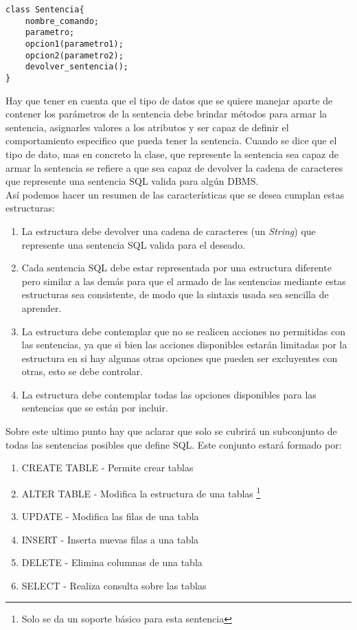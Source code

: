 \begin{lstlisting}[title=Pseudocódigo de la estructura de dato que contiene la sentencia]
class Sentencia{
	nombre_comando;
	parametro;
	opcion1(parametro1);
	opcion2(parametro2);
	devolver_sentencia();
}
\end{lstlisting}

Hay que tener en cuenta que el tipo de datos que se quiere manejar aparte de contener los parámetros de la sentencia debe brindar métodos para armar la sentencia, asignarles valores a los atributos y ser capaz de definir el comportamiento especifico que pueda tener la sentencia. Cuando se dice que el tipo de dato, mas en concreto la clase, que represente la sentencia sea capaz de armar la sentencia se refiere a que sea capaz de devolver la cadena de caracteres que represente una sentencia SQL valida para algún DBMS.\\
Así podemos hacer un resumen de las características que se desea cumplan estas estructuras:
\begin{enumerate}
	\item La estructura debe devolver una cadena de caracteres (un \textit{String}) que represente una sentencia SQL valida para el \dd deseado.
	\item Cada sentencia  SQL debe estar representada por una estructura diferente pero similar a las demás para que el armado de las sentencias mediante estas estructuras sea consistente, de modo que la sintaxis usada sea sencilla de aprender. 
	\item La estructura debe contemplar que no se realicen acciones no permitidas con las sentencias, ya que si bien las acciones disponibles estarán limitadas por la estructura en si hay algunas otras opciones que pueden ser excluyentes con otras, esto se debe controlar.
	\item La estructura debe contemplar todas las opciones disponibles para las sentencias que se están por incluir.
\end{enumerate}
Sobre este ultimo punto hay que aclarar que solo se cubrirá un subconjunto de todas las sentencias posibles que define SQL. Este conjunto estará formado por:
\begin{enumerate}
\item CREATE TABLE - Permite crear tablas 
\item ALTER TABLE - Modifica la estructura de una tablas \footnote{Solo se da un soporte básico para esta sentencia}
\item UPDATE - Modifica las filas de una tabla 
\item INSERT - Inserta nuevas filas a una tabla
\item DELETE - Elimina columnas de una tabla
\item SELECT - Realiza consulta sobre las tablas
\end{enumerate}

